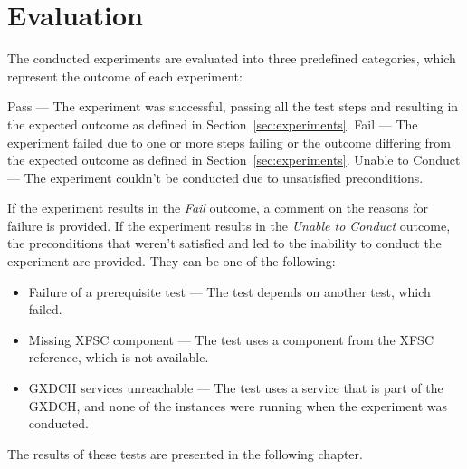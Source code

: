 \section{Evaluation}\label{sec:evaluation}

The conducted experiments are evaluated into three predefined categories, which represent the outcome of each experiment:

Pass --- The experiment was successful, passing all the test steps and resulting in the expected outcome as defined in Section~\ref{sec:experiments}.
Fail --- The experiment failed due to one or more steps failing or the outcome differing from the expected outcome as defined in Section~\ref{sec:experiments}.
Unable to Conduct --- The experiment couldn't be conducted due to unsatisfied preconditions.

If the experiment results in the \textit{Fail} outcome, a comment on the reasons for failure is provided.
If the experiment results in the \textit{Unable to Conduct} outcome, the preconditions that weren't satisfied and led to the inability to conduct the experiment are provided.
They can be one of the following:
\begin{itemize}
    \item Failure of a prerequisite test --- The test depends on another test, which failed.
    \item Missing XFSC component --- The test uses a component from the XFSC reference, which is not available.
    \item GXDCH services unreachable --- The test uses a service that is part of the GXDCH, and none of the instances were running when the experiment was conducted.
\end{itemize}

The results of these tests are presented in the following chapter.
